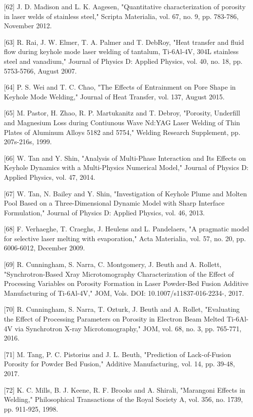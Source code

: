 \documentclass[10pt]{article}
\begin{document}
[62] J. D. Madison and L. K. Aagesen, "Quantitative characterization of porosity in laser welds of stainless steel," Scripta Materialia, vol. 67, no. 9, pp. 783-786, November 2012.

[63] R. Rai, J. W. Elmer, T. A. Palmer and T. DebRoy, "Heat transfer and fluid flow during keyhole mode laser welding of tantalum, Ti-6Al-4V, 304L stainless steel and vanadium," Journal of Physics D: Applied Physics, vol. 40, no. 18, pp. 5753-5766, August 2007.

[64] P. S. Wei and T. C. Chao, "The Effects of Entrainment on Pore Shape in Keyhole Mode Welding," Journal of Heat Transfer, vol. 137, August 2015.

[65] M. Pastor, H. Zhao, R. P. Martukanitz and T. Debroy, "Porosity, Underfill and Magnesium Loss during Contiunous Wave Nd:YAG Laser Welding of Thin Plates of Aluminum Alloys 5182 and 5754," Welding Research Supplement, pp. 207s-216s, 1999.

[66] W. Tan and Y. Shin, "Analysis of Multi-Phase Interaction and Its Effects on Keyhole Dynamics with a Multi-Physics Numerical Model," Journal of Physics D: Applied Physics, vol. 47, 2014.

[67] W. Tan, N. Bailey and Y. Shin, "Investigation of Keyhole Plume and Molten Pool Based on a Three-Dimensional Dynamic Model with Sharp Interface Formulation," Journal of Physics D: Applied Physics, vol. 46, 2013.

[68] F. Verhaeghe, T. Craeghs, J. Heulens and L. Pandelaers, "A pragmatic model for selective laser melting with evaporation," Acta Materialia, vol. 57, no. 20, pp. 6006-6012, December 2009.

[69] R. Cunningham, S. Narra, C. Montgomery, J. Beuth and A. Rollett, "Synchrotron-Based Xray Microtomography Characterization of the Effect of Processing Variables on Porosity Formation in Laser Powder-Bed Fusion Additive Manufacturing of Ti-6Al-4V," JOM, Vols. DOI: 10.1007/s11837-016-2234-, 2017.

[70] R. Cunningham, S. Narra, T. Ozturk, J. Beuth and A. Rollet, "Evaluating the Effect of Processing Parameters on Porosity in Electron Beam Melted Ti-6Al-4V via Synchrotron X-ray Microtomography," JOM, vol. 68, no. 3, pp. 765-771, 2016.

[71] M. Tang, P. C. Pistorius and J. L. Beuth, "Prediction of Lack-of-Fusion Porosity for Powder Bed Fusion," Additive Manufacturing, vol. 14, pp. 39-48, 2017.

[72] K. C. Mills, B. J. Keene, R. F. Brooks and A. Shirali, "Marangoni Effects in Welding," Philosophical Transactions of the Royal Society A, vol. 356, no. 1739, pp. 911-925, 1998.
\end{document}
